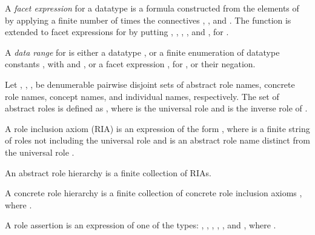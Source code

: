 \documentclass[a4paper]{llncs}
\newcommand{\vipcomment}[1]{}
\begin{document}
A \emph{facet expression} for a datatype  is a formula  constructed from the elements of  by applying a finite number of times the connectives , , and . The function   is extended to facet expressions for  by putting , , , , and , for .

A \emph{data range}  for  is either a datatype , or a finite enumeration of datatype constants , with  and , or a facet expression , for , or their negation.




Let , , ,  be denumerable pairwise disjoint sets of abstract role names, concrete role names, concept names, and individual names, respectively.
The set of abstract roles is defined as , where  is the universal role and  is the inverse role of .





A role inclusion axiom (RIA) is an expression of the form , where  is a finite string of roles not including the universal role  and  is an abstract role name distinct from the universal role .


An abstract role hierarchy  is a finite collection of RIAs. \vipcomment{ A strict partial order  on   is called \emph{a regular order} if  satisfies, additionally,  iff , for all roles R and S.\footnote{We recall that a strict partial order   on a set  is an irreflexive and transitive relation on .}



 A RIA  is -\emph{regular} if  is an abstract role name, and one of the following conditions holds:

\begin{enumerate}
\item{,}
\item{,}
\item{ and , for all ,}
\item{ and , for all ,}
\item{ and , for all .}
\end{enumerate}
An abstract role hierarchy  is regular if there exists a regular order  such that each RIA in  is -regular.
}






A concrete role hierarchy  is a finite collection of concrete role inclusion axioms , where .

A role assertion is an expression of one of the types: , , , , , and , where .
\end{document}
